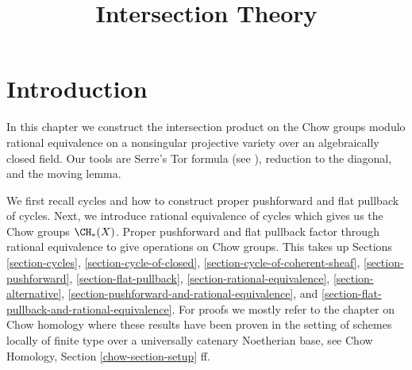 

%


\title{Intersection Theory}


\maketitle

\label{section-phantom}

\tableofcontents


\section{Introduction}
\label{section-introduction}

\noindent
In this chapter we construct the intersection product on the Chow groups
modulo rational equivalence on a nonsingular projective variety over an
algebraically closed field. Our tools are Serre's Tor formula
(see \cite[Chapter V]{Serre_algebre_locale}), reduction to the diagonal,
and the moving lemma.

\medskip\noindent
We first recall cycles and how to construct proper pushforward and
flat pullback of cycles. Next, we introduce rational equivalence of cycles
which gives us the Chow groups $\CH_*(X)$. Proper pushforward and flat pullback
factor through rational equivalence to give operations on Chow groups.
This takes up Sections 
\ref{section-cycles},
\ref{section-cycle-of-closed},
\ref{section-cycle-of-coherent-sheaf},
\ref{section-pushforward},
\ref{section-flat-pullback},
\ref{section-rational-equivalence},
\ref{section-alternative},
\ref{section-pushforward-and-rational-equivalence}, and
\ref{section-flat-pullback-and-rational-equivalence}.
For proofs we mostly refer to the chapter on Chow homology
where these results have been proven in the setting of
schemes locally of finite type over a universally catenary Noetherian base, see
Chow Homology, Section \ref{chow-section-setup} ff.


